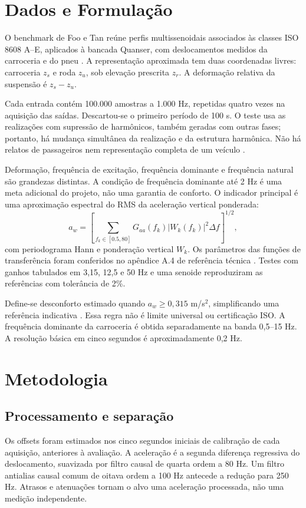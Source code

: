 \documentclass[conference]{IEEEtran}
\begin{document}
\section{Dados e Formulação}
O benchmark de Foo e Tan reúne perfis multissenoidais associados às classes ISO 8608 A--E, aplicados à bancada Quanser, com deslocamentos medidos da carroceria e do pneu \cite{dataset,benchmark}. A representação aproximada tem duas coordenadas livres: carroceria $z_s$ e roda $z_u$, sob elevação prescrita $z_r$. A deformação relativa da suspensão é $z_s-z_u$.

Cada entrada contém 100.000 amostras a 1.000 Hz, repetidas quatro vezes na aquisição das saídas. Descartou-se o primeiro período de 100 s. O teste usa as realizações com supressão de harmônicos, também geradas com outras fases; portanto, há mudança simultânea da realização e da estrutura harmônica. Não há relatos de passageiros nem representação completa de um veículo \cite{benchmark}.

Deformação, frequência de excitação, frequência dominante e frequência natural são grandezas distintas. A condição de frequência dominante até 2 Hz é uma meta adicional do projeto, não uma garantia de conforto. O indicador principal é uma aproximação espectral do RMS da aceleração vertical ponderada:
\begin{equation}
 a_w=\left[\sum_{f_k\in[0.5,80]}G_{aa}(f_k)|W_k(f_k)|^2\Delta f\right]^{1/2},
\end{equation}
com periodograma Hann e ponderação vertical $W_k$. Os parâmetros das funções de transferência foram conferidos no apêndice A.4 de referência técnica \cite{vasquez}. Testes com ganhos tabulados em 3,15, 12,5 e 50 Hz e uma senoide reproduziram as referências com tolerância de 2\%.

Define-se desconforto estimado quando $a_w\geq0{,}315$ m/s$^2$, simplificando uma referência indicativa \cite{comfort}. Essa regra não é limite universal ou certificação ISO. A frequência dominante da carroceria é obtida separadamente na banda 0,5--15 Hz. A resolução básica em cinco segundos é aproximadamente 0,2 Hz.

\section{Metodologia}
\subsection{Processamento e separação}
Os offsets foram estimados nos cinco segundos iniciais de calibração de cada aquisição, anteriores à avaliação. A aceleração é a segunda diferença regressiva do deslocamento, suavizada por filtro causal de quarta ordem a 80 Hz. Um filtro antialias causal comum de oitava ordem a 100 Hz antecede a redução para 250 Hz. Atrasos e atenuações tornam o alvo uma aceleração processada, não uma medição independente.
\end{document}
